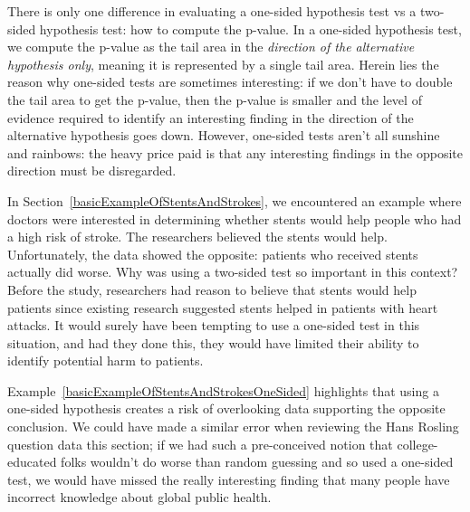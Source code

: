 There is only one difference in evaluating a one-sided
hypothesis test vs a two-sided hypothesis test: how to
compute the p-value.
In a one-sided hypothesis test, we compute the p-value as
the tail area in the \emph{direction of the alternative
hypothesis only}, meaning it is represented by a single
tail area. Herein lies the reason why one-sided tests
are sometimes interesting: if we don't have to double
the tail area to get the p-value, then the p-value is
smaller and the level of evidence required to identify
an interesting finding in the direction of the
alternative hypothesis goes down.
However, one-sided tests aren't all sunshine and rainbows:
the heavy price paid is that any interesting findings
in the opposite direction must be disregarded.

\begin{examplewrap}
\begin{nexample}{
    In Section~\ref{basicExampleOfStentsAndStrokes},
    we encountered an example where doctors were interested
    in determining whether stents would help people who had
    a high risk of stroke.
    The researchers believed the stents would help.
    Unfortunately, the data showed the opposite:
    patients who received stents actually did worse.
    Why was using a two-sided test so important in
    this context?}
    \label{basicExampleOfStentsAndStrokesOneSided}
  Before the study, researchers had reason to believe
  that stents would help patients since existing research
  suggested stents helped in patients with heart attacks.
  It would surely have been tempting to use a one-sided
  test in this situation, and had they done this,
  they would have limited their ability to identify
  potential harm to patients.
\end{nexample}
\end{examplewrap}

Example~\ref{basicExampleOfStentsAndStrokesOneSided}
highlights that using a one-sided hypothesis creates
a risk of overlooking data supporting the opposite
conclusion.
We could have made a similar error when reviewing
the Hans Rosling question data this section;
if we had such a pre-conceived notion that
college-educated folks wouldn't do worse than random
guessing and so used a one-sided test,
we would have missed the really interesting finding
that many people have incorrect knowledge about
global public health.
%    

